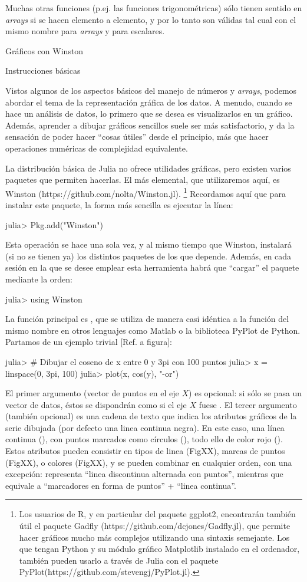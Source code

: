 ﻿\documentclass[spanish]{article}
\begin{document}
Muchas otras funciones (p.ej. las funciones trigonométricas) sólo
tienen sentido en \emph{arrays} si se hacen elemento a elemento, y
por lo tanto son válidas tal cual con el mismo nombre para \emph{arrays}
y para escalares.




Gráficos con Winston

Instrucciones básicas

Vistos algunos de los aspectos básicos del manejo de números y \emph{arrays},
podemos abordar el tema de la representación gráfica de los datos. A menudo,
cuando se hace un análisis de datos, lo primero que se desea es visualizarlos
en un gráfico. Además, aprender a dibujar gráficos sencillos suele ser
más satisfactorio, y da la sensación de poder hacer ``cosas útiles'' desde
el principio, más que hacer operaciones numéricas de complejidad equivalente.

La distribución básica de Julia no ofrece utilidades gráficas, pero
existen varios paquetes que permiten hacerlas. El más elemental, que
utilizaremos aquí, es Winston (https://github.com/nolta/Winston.jl).%
\footnote{Los usuarios de R, y en particular del paquete ggplot2, encontrarán
también útil el paquete Gadfly (https://github.com/dcjones/Gadfly.jl),
que permite hacer gráficos mucho más complejos utilizando una sintaxis
semejante. Los que tengan Python y su módulo gráfico Matplotlib instalado
en el ordenador, también pueden usarlo a través de Julia con el paquete
PyPlot(https://github.com/stevengj/PyPlot.jl).}%
Recordamos aquí que para instalar este paquete, la forma más sencilla
es ejecutar la línea:

julia> Pkg.add("Winston")

Esta operación se hace una sola vez, y al mismo tiempo que Winston, instalará
(si no se tienen ya) los distintos paquetes de los que depende.
Además, en cada sesión en la que se desee emplear esta herramienta
habrá que ``cargar'' el paquete mediante la orden:

julia> using Winston

La función principal es , que se utiliza de manera casi
idéntica a la función del mismo nombre en otros lenguajes como Matlab o la
biblioteca PyPlot de Python. Partamos de un ejemplo trivial [Ref. a figura]:

julia> # Dibujar el coseno de x entre 0 y 3pi con 100 puntos
julia> x = linspace(0, 3pi, 100)
julia> plot(x, cos(y), "-or")

El primer argumento (vector de puntos en el eje $X$) es opcional: si sólo
se pasa un vector de datos, éstos se dispondrán como si el eje $X$ fuese
\code{[1:length(y)]}. El tercer argumento (también opcional)
es una cadena de texto que indica los atributos gráficos de la serie dibujada
(por defecto una linea continua negra). En este caso, una línea continua
(), con puntos marcados como círculos (),
todo ello de color rojo (). Estos atributos pueden consistir
en tipos de linea (FigXX), marcas de puntos (FigXX), o colores (FigXX),
y se pueden combinar en cualquier orden, con una excepción:
 representa ``linea discontinua alternada con puntos'', mientras
que  equivale a ``marcadores en forma de puntos'' + 
``linea continua''.
\end{document}
